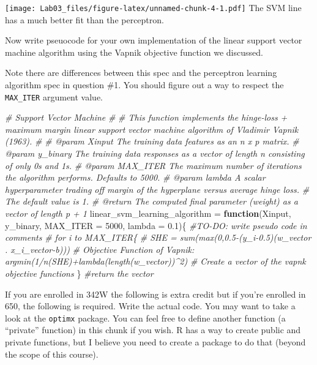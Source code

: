 \documentclass[
]{article}
\newenvironment{Shaded}{\begin{snugshade}}{\end{snugshade}}
\newcommand{\AttributeTok}[1]{\textcolor[rgb]{0.77,0.63,0.00}{#1}}
\newcommand{\CommentTok}[1]{\textcolor[rgb]{0.56,0.35,0.01}{\textit{#1}}}
\newcommand{\ControlFlowTok}[1]{\textcolor[rgb]{0.13,0.29,0.53}{\textbf{#1}}}
\newcommand{\DecValTok}[1]{\textcolor[rgb]{0.00,0.00,0.81}{#1}}
\newcommand{\FloatTok}[1]{\textcolor[rgb]{0.00,0.00,0.81}{#1}}
\newcommand{\NormalTok}[1]{#1}
\newcommand{\OtherTok}[1]{\textcolor[rgb]{0.56,0.35,0.01}{#1}}
\begin{document}
\texttt{[image: Lab03\_files/figure-latex/unnamed-chunk-4-1.pdf]} The SVM
line has a much better fit than the perceptron.

Now write pseuocode for your own implementation of the linear support
vector machine algorithm using the Vapnik objective function we
discussed.

Note there are differences between this spec and the perceptron learning
algorithm spec in question \#1. You should figure out a way to respect
the \texttt{MAX\_ITER} argument value.

\begin{Shaded}
\begin{Highlighting}[]
\CommentTok{\#\textquotesingle{} Support Vector Machine }
\CommentTok{\#}
\CommentTok{\#\textquotesingle{} This function implements the hinge{-}loss + maximum margin linear support vector machine algorithm of Vladimir Vapnik (1963).}
\CommentTok{\#\textquotesingle{}}
\CommentTok{\#\textquotesingle{} @param Xinput      The training data features as an n x p matrix.}
\CommentTok{\#\textquotesingle{} @param y\_binary    The training data responses as a vector of length n consisting of only 0\textquotesingle{}s and 1\textquotesingle{}s.}
\CommentTok{\#\textquotesingle{} @param MAX\_ITER    The maximum number of iterations the algorithm performs. Defaults to 5000.}
\CommentTok{\#\textquotesingle{} @param lambda      A scalar hyperparameter trading off margin of the hyperplane versus average hinge loss.}
\CommentTok{\#\textquotesingle{}                    The default value is 1.}
\CommentTok{\#\textquotesingle{} @return            The computed final parameter (weight) as a vector of length p + 1}
\NormalTok{linear\_svm\_learning\_algorithm }\OtherTok{=} \ControlFlowTok{function}\NormalTok{(Xinput, y\_binary, }\AttributeTok{MAX\_ITER =} \DecValTok{5000}\NormalTok{, }\AttributeTok{lambda =} \FloatTok{0.1}\NormalTok{)\{}
\CommentTok{\#TO{-}DO: write pseudo code in comments}
\CommentTok{\# for i to MAX\_ITER\{}
  \CommentTok{\# SHE = sum(max(0,0.5{-}(y\_i{-}0.5)(w\_vector . x\_i\_vector{-}b)))}
  \CommentTok{\# Objective Function of Vapnik: argmin(1/n(SHE)+lambda(length(w\_vector))\^{}2)}
  \CommentTok{\# Create a vector of the vapnk objective functions}
\NormalTok{\}}
\CommentTok{\#return the vector}
\end{Highlighting}
\end{Shaded}

If you are enrolled in 342W the following is extra credit but if you're
enrolled in 650, the following is required. Write the actual code. You
may want to take a look at the \texttt{optimx} package. You can feel
free to define another function (a ``private'' function) in this chunk
if you wish. R has a way to create public and private functions, but I
believe you need to create a package to do that (beyond the scope of
this course).
\end{document}
